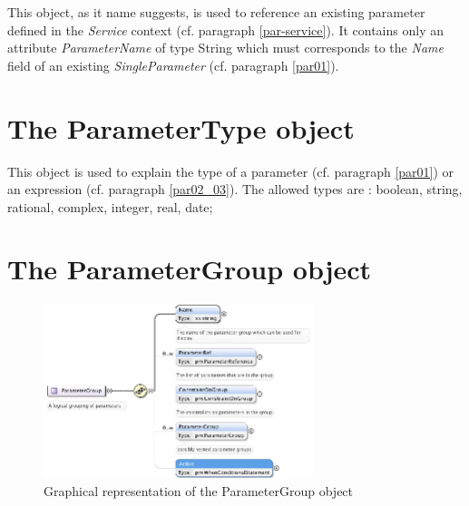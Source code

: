 \documentclass[a4paper,11pt] {ivoa}
\begin{document}
This object, as it name suggests, is used to reference an existing parameter defined in the {\it
Service} context (cf. paragraph
\ref{par-service}). It  contains only an attribute {\it ParameterName} of type String which
must corresponds to the {\it Name} field of an existing {\it SingleParameter} (cf. paragraph \ref {par01}).

\section{The ParameterType object}\label{par-ParameterType}
This object is used to explain the type of a parameter (cf. paragraph \ref{par01}) or an expression
(cf. paragraph \ref{par02_03}). The allowed types are : boolean, string, rational, complex,
integer, real, date;

\section{The ParameterGroup object}\label{par-group}

\begin{figure}[htbp]
\begin{center}
\includegraphics[width=0.7\textwidth]{pictures/ParameterGroup.jpg} 
\caption{Graphical representation of the ParameterGroup object}
\label{Pic-ParameterGroup}
\end{center}
\end{figure}
\end{document}
